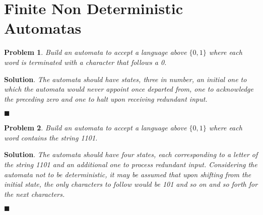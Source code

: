 \documentclass[12pt]{article}
\renewcommand{\=}[1]{\stackrel{#1}{=}} %
\newtheorem{p}{Problem}[section]
\theoremstyle{definition}
\newenvironment{s}{%
        \begin{trivlist} \item \textbf{Solution}. }{%
            \hspace*{\fill} $\blacksquare$\end{trivlist}}%
\begin{document}
\section{Finite Non Deterministic Automatas}
\begin{p}
  \emph{\newline Build an automata to accept a language above $\{0,1\}$ where each word is terminated with a character that follows a 0.} \newline
\end{p}
\begin{s} \newline
 \emph{The automata should have states, three in number, an initial one to which the automata would never appoint once departed from, one to acknowledge the preceding zero and one to halt upon receiving redundant input.} \newline
  \\
\end{s}
\begin{p}
  \emph{\newline Build an automata to accept a language above $\{0,1\}$ where each word contains the string 1101.} \newline
\end{p}
\begin{s} \newline
 \emph{The automata should have four states, each corresponding to a letter of the string 1101 and an additional one to process redundant input. Considering the automata not to be deterministic, it may be assumed that upon shifting from the initial state, the only characters to follow would be 101 and so on and so forth for the next characters.} \newline
  \\
\end{s}
\end{document}
